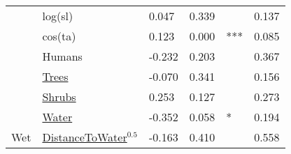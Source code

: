 \begin{tabular}[t]{llllll}
 & log(sl) & 0.047 & 0.339 &  & 0.137\\

 & cos(ta) & 0.123 & 0.000 & *** & 0.085\\

 & Humans & -0.232 & 0.203 &  & 0.367\\

 & \underline{Trees} & -0.070 & 0.341 &  & 0.156\\

 & \underline{Shrubs} & 0.253 & 0.127 &  & 0.273\\

 & \underline{Water} & -0.352 & 0.058 & * & 0.194\\

\multirow{-8}{*}{\raggedright\arraybackslash Wet} & \underline{DistanceToWater}$^{0.5}$ & -0.163 & 0.410 &  & 0.558\\
\bottomrule
\end{tabular}
